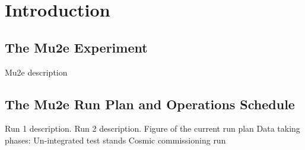 \section{Introduction}
\label{sec:intro}
\subsection {The Mu2e Experiment}
\label{subsec:mu2e}
Mu2e description
\subsection{The Mu2e Run Plan and Operations Schedule }
\label{subsec:runplan}
Run 1 description.
Run 2 description.
Figure of the current run plan
Data taking phases:
Un-integrated test stands
Cosmic commissioning run

